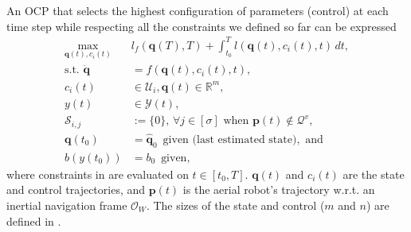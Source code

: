 An OCP that selects the highest configuration of parameters (control) at each time step while respecting all the constraints we defined so far can be expressed
\begin{subequations}\label{eq:ocp-output-mpc}\begin{align}
  \max_{\mathbf{q}(t),c_i(t)}&{l_f(\mathbf{q}(T),T)+\int_{t_0}^T{l(\mathbf{q}(t),c_i(t),t)\,dt}},\\
  \text{s.t. }\dot{\mathbf{q}}&=f(\mathbf{q}(t),c_i(t),t),\label{eq:dyn-evol}\\
  c_i(t)&\in\mathcal{U}_i,\mathbf{q}(t)\in\mathbb{R}^m,\label{eq:state-cont-const-mpc}\\
  y(t)&\in\mathcal{Y}(t),\label{eq:batt-const-mpc}\\
  \mathcal{S}_{i,j}&:=\{0\},\,\forall j \in [\sigma]\text{ when }\mathbf{p}(t)\notin\mathcal{Q}^v,\label{eq:polyg-const}\\
  \mathbf{q}(t_0)&=\hat{\mathbf{q}}_0\,\,\,\text{given (last estimated state)},\text{ and}\label{eq:ocp-outp-mpc-state-est}\\
  b(y(t_0))&=b_0\,\,\,\text{given},
\end{align}\end{subequations}
where constraints in  are evaluated on $t\in[t_0,T]$. $\mathbf{q}(t)$ and $c_i(t)$ are the state and control trajectories, and $\mathbf{p}(t)$ is the aerial robot's trajectory w.r.t. an inertial navigation frame $\mathcal{O}_W$. The sizes of the state and control ($m$ and $n$) are defined in . 

